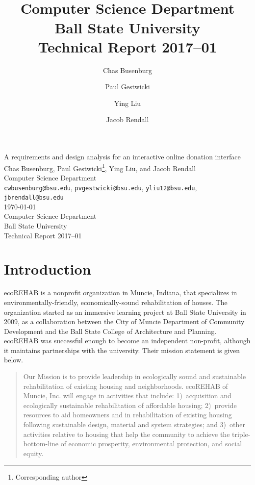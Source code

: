 \documentclass[letter]{article}
\title{\\
  Computer Science Department\\
  Ball State University\\
  Technical Report 2017--01}
\author{
  Chas Busenburg
  \and
  Paul Gestwicki
  \and
  Ying Liu
  \and
  Jacob Rendall}
\begin{document}
\begin{centering}
{\Large A requirements and design analysis for an interactive online donation interface}\\
\vspace{0.5cm}
Chas Busenburg, Paul Gestwicki\footnote{Corresponding author}, Ying Liu, and Jacob Rendall\\
Computer Science Department\\
\texttt{cwbusenburg@bsu.edu}, 
\texttt{pvgestwicki@bsu.edu},
\texttt{yliu12@bsu.edu},
\texttt{jbrendall@bsu.edu}\\
\vspace{0.5cm}
\today\\
\vspace{0.5cm}
Computer Science Department\\
Ball State University\\
Technical Report 2017--01\\
\end{centering}

\section*{Introduction}

ecoREHAB is a nonprofit organization in Muncie, Indiana, that specializes
in environmentally-friendly, economically-sound rehabilitation of houses.
The organization started as an immersive learning project at Ball
State University in 2009, as a collaboration between the 
City of Muncie Department of Community Development and the 
Ball State College of Architecture and Planning.
ecoREHAB was successful enough to become an independent non-profit, 
although it maintains partnerships with the university.
Their mission statement is given below.

\begin{quote}
  Our Mission is to provide leadership in ecologically sound and
  sustainable rehabilitation of existing housing and
  neighborhoods. ecoREHAB of Muncie, Inc. will engage in activities
  that include: 1)~acquisition and ecologically sustainable
  rehabilitation of affordable housing; 2)~provide resources to aid
  homeowners and in rehabilitation of existing housing following
  sustainable design, material and system strategies; and 3)~other
  activities relative to housing that help the community to achieve
  the triple-bottom-line of economic prosperity, environmental
  protection, and social equity.
\end{quote}
\end{document}
